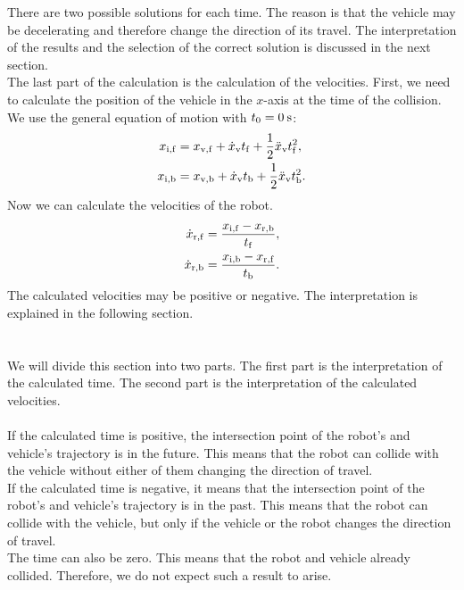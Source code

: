         There are two possible solutions for each time. The reason is that the vehicle may be decelerating and therefore change the direction of its travel. The interpretation of the results and the selection of the correct solution is discussed in the next section.\\
        The last part of the calculation is the calculation of the velocities. First, we need to calculate the position of the vehicle in the $x$-axis at the time of the collision. We use the general equation of motion with $t_{0}=0\:\rm{s}$:
        \begin{align}
            x_{\rm{i,f}} &= x_{\rm{v,f}} + \dot{x}_{\rm{v}}t_{\rm{f}} + \frac{1}{2}\ddot{x}_{\rm{v}}t_{\rm{f}}^2,\\
            x_{\rm{i,b}} &= x_{\rm{v,b}} + \dot{x}_{\rm{v}}t_{\rm{b}} + \frac{1}{2}\ddot{x}_{\rm{v}}t_{\rm{b}}^2.
        \end{align}
        Now we can calculate the velocities of the robot.
        \begin{align}
            \dot{x}_{\rm{r,f}} &= \frac{x_{\rm{i,f}}-x_{\rm{r,b}}}{t_{\rm{f}}},\\
            \dot{x}_{\rm{r,b}} &= \frac{x_{\rm{i,b}}-x_{\rm{r,f}}}{t_{\rm{b}}}.
        \end{align}
        The calculated velocities may be positive or negative. The interpretation is explained in the following section.\\\\
    \\
        We will divide this section into two parts. The first part is the interpretation of the calculated time. The second part is the interpretation of the calculated velocities.\\\\
        If the calculated time is positive, the intersection point of the robot's and vehicle's trajectory is in the future. This means that the robot can collide with the vehicle without either of them changing the direction of travel.\\
        If the calculated time is negative, it means that the intersection point of the robot's and vehicle's trajectory is in the past. This means that the robot can collide with the vehicle, but only if the vehicle or the robot changes the direction of travel.\\
        The time can also be zero. This means that the robot and vehicle already collided. Therefore, we do not expect such a result to arise.\\
